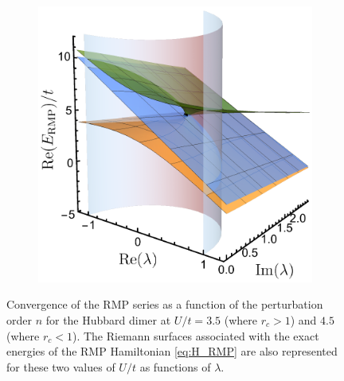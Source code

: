 \documentclass[aps,prb,reprint,noshowkeys,superscriptaddress]{revtex4-1}
\begin{document}
\begin{figure}
\begin{subfigure}{0.32\textwidth}
		\subcaption{\label{subfig:RMP_cvg}}
    \end{subfigure}
    \begin{subfigure}{0.32\textwidth}
	\includegraphics[height=0.75\textwidth]{fig4c}	
    \end{subfigure}
	\caption{
	Convergence of the RMP series as a function of the perturbation order $n$ for the Hubbard dimer at $U/t = 3.5$ (where $r_c > 1$) and $4.5$ (where $r_c < 1$).
	The Riemann surfaces associated with the exact energies of the RMP Hamiltonian \eqref{eq:H_RMP} are also represented for these two values of $U/t$ as functions of $\lambda$. 
	\label{fig:RMP}}
\end{figure}
\end{document}
